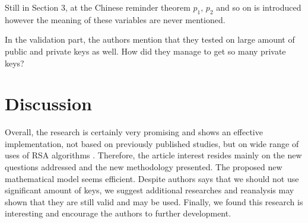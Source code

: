 \documentclass[11 pt,a4paper,english]{article}
\begin{document}
Still in Section 3, at the Chinese reminder theorem $p_1$, $p_2$ and so on is introduced however the meaning of these variables are never mentioned.

In the validation part, the authors mention that they tested on large amount of public and private keys as well. How did they manage to get so many private keys?  


\section{Discussion}
Overall, the research is certainly very promising and shows an effective implementation, not based on previously published studies, but on wide range of uses of RSA algorithms \cite{10.1145/359340.359342}.
Therefore, the article interest resides mainly on the new questions addressed and the new methodology presented. The proposed new mathematical model seems efficient. Despite authors says that we should not use significant amount of keys, we suggest additional researches and reanalysis may shown that they are still valid and may be used.
Finally, we found this research is interesting and encourage the authors to further development.




\newpage
{}

\end{document}
